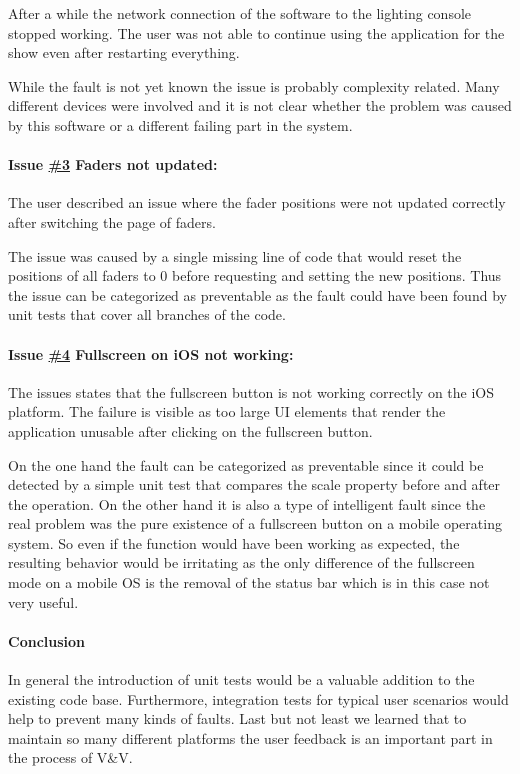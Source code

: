 \documentclass{scrreprt}
\begin{document}
After a while the network connection of the software to the lighting console stopped working. The user was not able to continue using the application for the show even after restarting everything.

While the fault is not yet known the issue is probably complexity related. Many different devices were involved and it is not clear whether the problem was caused by this software or a different failing part in the system.


\paragraph{Issue \href{https://github.com/ETCLabs/LuminosusEosEdition/issues/3}{\#3} Faders not updated:}

The user described an issue where the fader positions were not updated correctly after switching the page of faders.

The issue was caused by a single missing line of code that would reset the positions of all faders to 0 before requesting and setting the new positions.
Thus the issue can be categorized as preventable as the fault could have been found by unit tests that cover all branches of the code.


\paragraph{Issue \href{https://github.com/ETCLabs/LuminosusEosEdition/issues/4}{\#4} Fullscreen on iOS not working:}

The issues states that the fullscreen button is not working correctly on the iOS platform. The failure is visible as too large UI elements that render the application unusable after clicking on the fullscreen button.

On the one hand the fault can be categorized as preventable since it could be detected by a simple unit test that compares the scale property before and after the operation.
On the other hand it is also a type of intelligent fault since the real problem was the pure existence of a fullscreen button on a mobile operating system. So even if the function would have been working as expected, the resulting behavior would be irritating as the only difference of the fullscreen mode on a mobile OS is the removal of the status bar which is in this case not very useful.

\paragraph{Conclusion}
In general the introduction of unit tests would be a valuable addition to the existing code base. Furthermore, integration tests for typical user scenarios would help to prevent many kinds of faults. Last but not least we learned that to maintain so many different platforms the user feedback is an important part in the process of V\&V.
\end{document}
